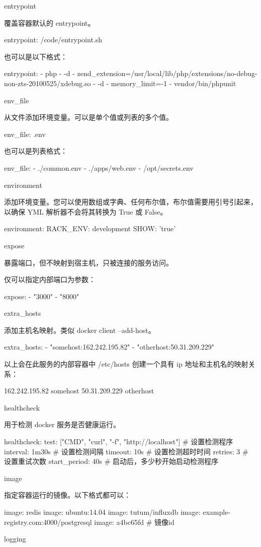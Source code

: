 entrypoint

覆盖容器默认的 entrypoint。

entrypoint: /code/entrypoint.sh

也可以是以下格式：

entrypoint:
    - php
    - -d
    - zend_extension=/usr/local/lib/php/extensions/no-debug-non-zts-20100525/xdebug.so
    - -d
    - memory_limit=-1
    - vendor/bin/phpunit

env_file

从文件添加环境变量。可以是单个值或列表的多个值。

env_file: .env

也可以是列表格式：

env_file:
  - ./common.env
  - ./apps/web.env
  - /opt/secrets.env

environment

添加环境变量。您可以使用数组或字典、任何布尔值，布尔值需要用引号引起来，以确保 YML 解析器不会将其转换为 True 或 False。

environment:
  RACK_ENV: development
  SHOW: 'true'

expose

暴露端口，但不映射到宿主机，只被连接的服务访问。

仅可以指定内部端口为参数：

expose:
 - "3000"
 - "8000"

extra_hosts

添加主机名映射。类似 docker client --add-host。

extra_hosts:
 - "somehost:162.242.195.82"
 - "otherhost:50.31.209.229"

以上会在此服务的内部容器中 /etc/hosts 创建一个具有 ip 地址和主机名的映射关系：

162.242.195.82  somehost
50.31.209.229   otherhost

healthcheck

用于检测 docker 服务是否健康运行。

healthcheck:
  test: ["CMD", "curl", "-f", "http://localhost"] # 设置检测程序
  interval: 1m30s # 设置检测间隔
  timeout: 10s # 设置检测超时时间
  retries: 3 # 设置重试次数
  start_period: 40s # 启动后，多少秒开始启动检测程序

image

指定容器运行的镜像。以下格式都可以：

image: redis
image: ubuntu:14.04
image: tutum/influxdb
image: example-registry.com:4000/postgresql
image: a4bc65fd # 镜像id

logging

